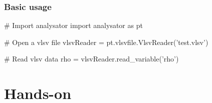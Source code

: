 \documentclass{beamer}
\begin{document}
\begin{frame}[fragile]
 \frametitle{Basic usage}
 \begin{python}[basicstyle=\tiny]
  # Import analysator
  import analysator as pt
  
  # Open a vlsv file
  vlsvReader = pt.vlsvfile.VlsvReader('test.vlsv')
  
  # Read vlsv data
  rho = vlsvReader.read_variable('rho')
  
 \end{python}

\end{frame}


\section{Hands-on}
\end{document}
